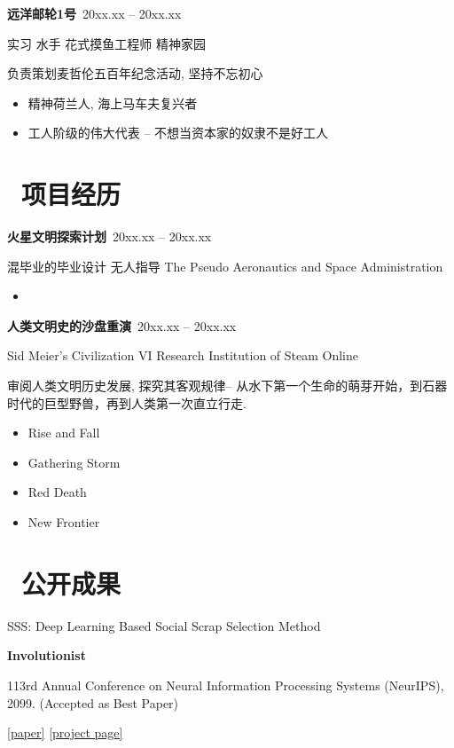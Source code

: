 \textbf{远洋邮轮1号}\  \hfill 20xx.xx -- 20xx.xx

实习 \quad 水手 \quad 花式摸鱼工程师  \hfill 精神家园

负责策划麦哲伦五百年纪念活动, 坚持不忘初心
\begin{itemize}
  \item 精神荷兰人, 海上马车夫复兴者
  \item 工人阶级的伟大代表 -- 不想当资本家的奴隶不是好工人
\end{itemize}

\section{\makebox[\widthof{\faGraduationCap}][c]{\color{CVBlue}\faWrench }\ 项目经历}

\textbf{火星文明探索计划}\  \hfill 20xx.xx -- 20xx.xx

混毕业的毕业设计 \quad 无人指导 \hfill The Pseudo Aeronautics and Space Administration

\begin{itemize}
  \item 
\end{itemize}

\textbf{人类文明史的沙盘重演}\  \hfill 20xx.xx -- 20xx.xx

Sid Meier's Civilization VI \quad Research Institution of Steam \hfill Online 

审阅人类文明历史发展, 探究其客观规律-- 从水下第一个生命的萌芽开始，到石器时代的巨型野兽，再到人类第一次直立行走.
\begin{itemize}
  \item Rise and Fall
  \item Gathering Storm
  \item Red Death
  \item New Frontier
\end{itemize}

\section{\makebox[\widthof{\faGraduationCap}][c]{\color{CVBlue}\faInstitution}\ 公开成果}

SSS: Deep Learning Based Social Scrap Selection Method

\textbf{Involutionist}

113rd Annual Conference on Neural Information Processing Systems (NeurIPS), 2099. (Accepted as Best Paper)

\href{}{[paper]} \href{}{[project page]} 

